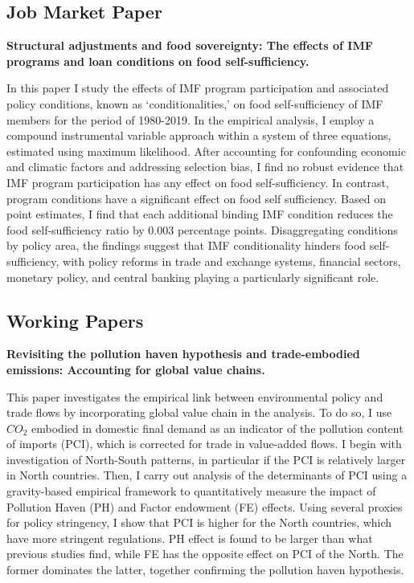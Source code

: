 
\subsection{Job Market Paper}

\textbf{Structural adjustments and food sovereignty: The effects of IMF
programs and loan conditions on food self-sufficiency.}
\vspace{1em}

 \parbox{\textwidth}{In this paper I study the effects of IMF program participation and associated policy conditions, known as ‘conditionalities,’ on food self-sufficiency of IMF members for the period of 1980-2019. In the empirical analysis, I employ a compound instrumental variable approach within a system of three equations, estimated using maximum likelihood. After accounting for confounding economic and climatic factors and addressing selection bias, I find no robust evidence that IMF program participation has any effect on food self-sufficiency. In contrast, program conditions have a significant effect on food self sufficiency. Based on point estimates, I find that each additional binding IMF condition reduces the food self-sufficiency ratio by 0.003 percentage points. Disaggregating conditions by policy area, the findings suggest that IMF conditionality hinders food self-sufficiency, with policy reforms in trade and exchange systems, financial sectors, monetary policy, and central banking playing a particularly significant role.}

\subsection{Working Papers}

\textbf{Revisiting the pollution haven hypothesis and trade-embodied emissions: Accounting for global value chains.}
\vspace{1em}

 \parbox{\textwidth}{This paper investigates the empirical link between environmental policy and trade flows by incorporating global value chain in the analysis. To do so, I use $CO_{2}$ embodied in domestic final demand as an indicator of the pollution content of imports (PCI), which is corrected for trade in value-added flows. I begin with investigation of North-South patterns, in particular if the PCI is relatively larger in North countries. Then, I carry out analysis of the determinants of PCI using a gravity-based empirical framework to quantitatively measure the impact of Pollution Haven (PH) and Factor endowment (FE) effects. Using several proxies for policy stringency, I show that PCI is higher for the North countries, which have more stringent regulations.  PH effect is found to be larger than what previous studies find, while FE has the opposite effect on PCI of the North. The former dominates the latter, together confirming the pollution haven hypothesis.}

